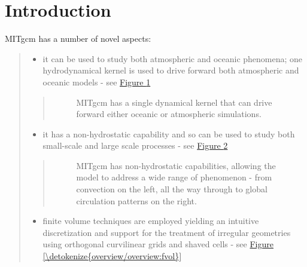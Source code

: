 \documentclass[letterpaper,10pt,english]{sphinxmanual}
\begin{document}
\section{Introduction}
\label{\detokenize{overview/overview:introduction}}
MITgcm has a number of novel aspects:
\begin{quote}
\begin{itemize}
\item {} 
it can be used to study both atmospheric and oceanic phenomena; one hydrodynamical kernel is used to drive forward both atmospheric and oceanic models - see \hyperref[\detokenize{overview/overview:onemodel}]{Figure \ref{\detokenize{overview/overview:onemodel}}}

\end{itemize}
\begin{quote}
\begin{figure}[htbp]
\centering
\capstart

\noindent{}
\caption{MITgcm has a single dynamical kernel that can drive forward either oceanic or atmospheric simulations.}\label{\detokenize{overview/overview:onemodel}}\end{figure}
\end{quote}
\begin{itemize}
\item {} 
it has a non-hydrostatic capability and so can be used to study both small-scale and large scale processes - see \hyperref[\detokenize{overview/overview:all-scales}]{Figure \ref{\detokenize{overview/overview:all-scales}}}

\end{itemize}
\begin{quote}
\begin{figure}[htbp]
\centering
\capstart

\noindent{}
\caption{MITgcm has non-hydrostatic capabilities, allowing the model to address a wide range of phenomenon - from convection on the left, all the way through to global circulation patterns on the right.}\label{\detokenize{overview/overview:all-scales}}\end{figure}
\end{quote}
\begin{itemize}
\item {} 
finite volume techniques are employed yielding an intuitive discretization and support for the treatment of irregular geometries using orthogonal curvilinear grids and shaved cells - see \hyperref[\detokenize{overview/overview:fvol}]{Figure \ref{\detokenize{overview/overview:fvol}}}


\end{itemize}
\end{quote}
\end{document}
